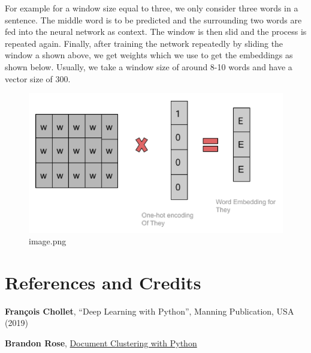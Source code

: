 \documentclass[11pt]{article}
\begin{document}
    For example for a window size equal to three, we only consider three
words in a sentence. The middle word is to be predicted and the
surrounding two words are fed into the neural network as context. The
window is then slid and the process is repeated again. Finally, after
training the network repeatedly by sliding the window a shown above, we
get weights which we use to get the embeddings as shown below. Usually,
we take a window size of around 8-10 words and have a vector size of
300.

    

    \begin{figure}
\centering
\includegraphics{./img/word-embedding-2.png}
\caption{image.png}
\end{figure}

    \hypertarget{references-and-credits}{%
\section{References and Credits}\label{references-and-credits}}

\textbf{François Chollet}, ``Deep Learning with Python'', Manning
Publication, USA (2019)

\textbf{Brandon Rose},
\href{Document\%20Clustering\%20with\%20Python}{Document Clustering with
Python}


    
    
    
\end{document}
